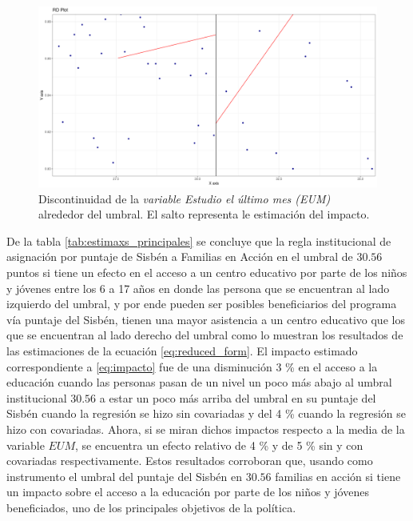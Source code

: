 \documentclass[AER]{AEA}
\begin{document}
\begin{figure}[h!]
    \centering
    \includegraphics[scale = 0.35]{imagenes/estimax_principal/main_estimax_interes.png}
    \caption{Discontinuidad de la \textit{variable Estudio el último mes (EUM)} alrededor del umbral. El salto representa le estimación del impacto.}
    \label{fig:main_estimax_interes}
\end{figure}


De la tabla \ref{tab:estimaxs_principales} se concluye que la regla institucional de asignación por puntaje de Sisbén a Familias en Acción en el umbral de $30.56$ puntos si tiene un efecto en el acceso a un centro educativo por parte de los niños y jóvenes entre los 6 a 17 años en donde las persona que se encuentran al lado izquierdo del umbral, y por ende pueden ser posibles beneficiarios del programa vía puntaje del Sisbén, tienen una mayor asistencia a un centro educativo que los que se encuentran al lado derecho del umbral como lo muestran los resultados de las estimaciones de la ecuación \ref{eq:reduced_form}. El impacto estimado correspondiente a \ref{eq:impacto} fue de una disminución 3 \% en el acceso a la educación cuando las personas pasan de un nivel un poco más abajo al umbral institucional $30.56$ a estar un poco más arriba del umbral en su puntaje del Sisbén cuando la regresión se hizo sin covariadas y del 4 \% cuando la regresión se hizo con covariadas. Ahora, si se miran dichos impactos respecto a la media de la variable $EUM$, se encuentra un efecto relativo de 4 \% y de 5 \%  sin y con covariadas respectivamente. Estos resultados corroboran que, usando como instrumento el umbral del puntaje del Sisbén en $30.56$ familias en acción si tiene un impacto sobre el acceso a la educación por parte de los niños y jóvenes beneficiados, uno de los principales objetivos de la política. 
\end{document}

